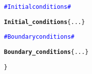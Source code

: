 {\begin{minipage}[c]{1\textwidth}
\begin{alltt}
\hspace{2cm}                \textcolor{blue}{\# Initial conditions \#}

\hspace{2cm}                {\bf{Initial\_conditions}} \{ ... \}

\hspace{2cm}                \textcolor{blue}{\# Boundary conditions \#}

\hspace{2cm}                {\bf{Boundary\_conditions}} \{ ... \}

\hspace{1cm}        \}
    \end{alltt}
\end{minipage}}
\vspace{0.1cm}



